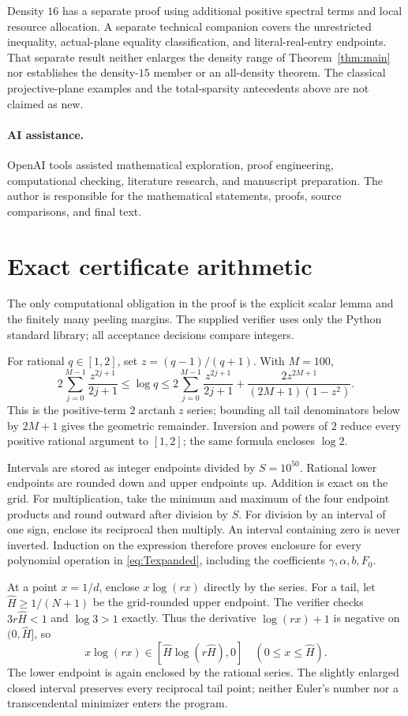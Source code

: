 \documentclass[11pt]{article}
\theoremstyle{remark}
\begin{document}
Density $16$ has a separate proof using additional positive spectral terms
and local resource allocation. A separate technical companion covers the unrestricted inequality, actual-plane
equality classification, and literal-real-entry endpoints. That separate
result neither enlarges the density range of Theorem~\ref{thm:main} nor
establishes the density-$15$ member or an all-density theorem.
The classical projective-plane examples and the total-sparsity antecedents
above are not claimed as new.

\paragraph{AI assistance.}
OpenAI tools assisted mathematical exploration, proof engineering, computational checking, literature research, and manuscript preparation. The author is responsible for the mathematical statements, proofs, source comparisons, and final text.

\appendix
\section{Exact certificate arithmetic}\label{app:exact}
The only computational obligation in the proof is the explicit scalar lemma
and the finitely many peeling margins. The supplied verifier uses only the
Python standard library; all acceptance decisions compare integers.

For rational $q\in[1,2]$, set $z=(q-1)/(q+1)$. With $M=100$,
\[
 2\sum_{j=0}^{M-1}\frac{z^{2j+1}}{2j+1}
 \le\log q\le
 2\sum_{j=0}^{M-1}\frac{z^{2j+1}}{2j+1}
 +\frac{2z^{2M+1}}{(2M+1)(1-z^2)}.
\]
This is the positive-term $2\operatorname{arctanh}z$ series; bounding all
tail denominators below by $2M+1$ gives the geometric remainder. Inversion
and powers of $2$ reduce every positive rational argument to $[1,2]$; the
same formula encloses $\log2$.

Intervals are stored as integer endpoints divided by $S=10^{50}$.
Rational lower endpoints are rounded down and upper endpoints up.
Addition is exact on the grid. For multiplication, take the minimum and
maximum of the four endpoint products and round outward after division by
$S$. For division by an interval of one sign, enclose its reciprocal then
multiply. An interval containing zero is never inverted. Induction on the
expression therefore proves enclosure for every polynomial operation in
\eqref{eq:Texpanded}, including the coefficients $\gamma,\alpha,b,F_0$.

At a point $x=1/d$, enclose $x\log(rx)$ directly by the series. For a tail,
let $\widehat H\ge1/(N+1)$ be the grid-rounded upper endpoint. The verifier
checks $3r\widehat H<1$ and $\log3>1$ exactly. Thus the derivative
$\log(rx)+1$ is negative on $(0,\widehat H]$, so
\[
 x\log(rx)\in[\widehat H\log(r\widehat H),0]
       \quad(0\le x\le\widehat H).
\]
The lower endpoint is again enclosed by the rational series. The slightly
enlarged closed interval preserves every reciprocal tail point; neither
Euler's number nor a transcendental minimizer enters the program.
\end{document}
